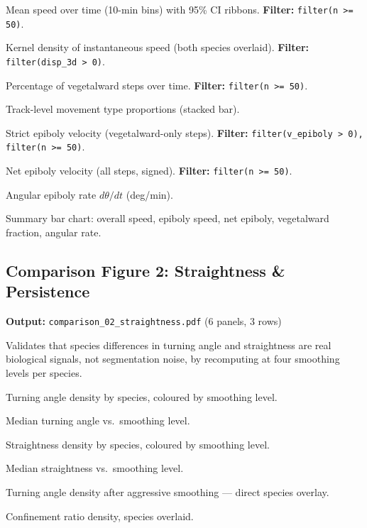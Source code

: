 \documentclass[11pt,a4paper]{article}
\begin{document}
\begin{description}[style=nextline,leftmargin=1.5cm]
  \item[1a] Mean speed over time (10-min bins) with 95\% CI ribbons.
    \textbf{Filter:} \texttt{filter(n >= 50)}.
  \item[1b] Kernel density of instantaneous speed (both species overlaid).
    \textbf{Filter:} \texttt{filter(disp\_3d > 0)}.
  \item[1c] Percentage of vegetalward steps over time.
    \textbf{Filter:} \texttt{filter(n >= 50)}.
  \item[1d] Track-level movement type proportions (stacked bar).
  \item[1e] Strict epiboly velocity (vegetalward-only steps).
    \textbf{Filter:} \texttt{filter(v\_epiboly > 0), filter(n >= 50)}.
  \item[1f] Net epiboly velocity (all steps, signed).
    \textbf{Filter:} \texttt{filter(n >= 50)}.
  \item[1g] Angular epiboly rate $d\theta/dt$ (deg/min).
  \item[1h] Summary bar chart: overall speed, epiboly speed, net epiboly,
    vegetalward fraction, angular rate.
\end{description}


\subsection*{Comparison Figure 2: Straightness \& Persistence}

\noindent\textbf{Output:} \texttt{comparison\_02\_straightness.pdf}
(6 panels, 3 rows)

Validates that species differences in turning angle and straightness are
real biological signals, not segmentation noise, by recomputing at four
smoothing levels per species.

\begin{description}[style=nextline,leftmargin=1.5cm]
  \item[2a] Turning angle density by species, coloured by smoothing level.
  \item[2b] Median turning angle vs.\ smoothing level.
  \item[2c] Straightness density by species, coloured by smoothing level.
  \item[2d] Median straightness vs.\ smoothing level.
  \item[2e] Turning angle density after aggressive smoothing --- direct
    species overlay.
  \item[2f] Confinement ratio density, species overlaid.
\end{description}
\end{document}
